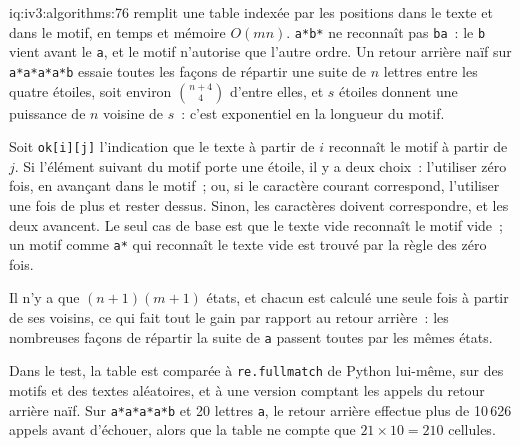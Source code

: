 \begin{solution}{iq:iv3:algorithms:76}
 remplit une table indexée par les positions dans le texte et dans le motif, en temps et mémoire $O(mn)$. \texttt{a*b*} ne reconnaît pas \texttt{ba}~: le \texttt{b} vient avant le \texttt{a}, et le motif n'autorise que l'autre ordre. Un retour arrière naïf sur \texttt{a*a*a*a*b} essaie toutes les façons de répartir une suite de $n$ lettres entre les quatre étoiles, soit environ $\binom{n + 4}{4}$ d'entre elles, et $s$ étoiles donnent une puissance de $n$ voisine de $s$~: c'est exponentiel en la longueur du motif.
\label{lst:iv3:al:regex}

Soit \texttt{ok[i][j]} l'indication que le texte à partir de $i$ reconnaît le motif à partir de $j$. Si l'élément suivant du motif porte une étoile, il y a deux choix~: l'utiliser zéro fois, en avançant dans le motif~; ou, si le caractère courant correspond, l'utiliser une fois de plus et rester dessus. Sinon, les caractères doivent correspondre, et les deux avancent. Le seul cas de base est que le texte vide reconnaît le motif vide~; un motif comme \texttt{a*} qui reconnaît le texte vide est trouvé par la règle des zéro fois.

Il n'y a que $(n + 1)(m + 1)$ états, et chacun est calculé une seule fois à partir de ses voisins, ce qui fait tout le gain par rapport au retour arrière~: les nombreuses façons de répartir la suite de \texttt{a} passent toutes par les mêmes états.

Dans le test, la table est comparée à \texttt{re.fullmatch} de Python lui-même, sur des motifs et des textes aléatoires, et à une version comptant les appels du retour arrière naïf. Sur \texttt{a*a*a*a*b} et 20 lettres \texttt{a}, le retour arrière effectue plus de 10\,626 appels avant d'échouer, alors que la table ne compte que $21 \times 10 = 210$ cellules.

\end{solution}

